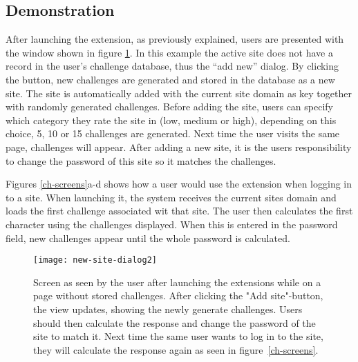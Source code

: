 

\subsection{Demonstration}\label{demo}
After launching the extension, as previously explained, users are presented with the window shown in figure \ref{launch-screen}. In this example the active site does not have a record in the user's challenge database, thus the ``add new'' dialog. By clicking the button, new challenges are generated and stored in the database as a new site. The site is automatically added with the current site domain as key together with randomly generated challenges. Before adding the site, users can specify which category they rate the site in (low, medium or high), depending on this choice, 5, 10 or 15 challenges are generated. Next time the user visits the same page, challenges will appear. After adding a new site, it is the users responsibility to change the password of this site so it matches the challenges.

\par Figures \ref{ch-screens}a-d shows how a user would use the extension when logging in to a site. When launching it, the system receives the current sites domain and loads the first challenge associated wit that site. The user then calculates the first character using the challenges displayed. When this is entered in the password field, new challenges appear until the whole password is calculated. 

\begin{figure}
    \centering
    \texttt{[image: new-site-dialog2]} 
    \caption{Screen as seen by the user after launching the extensions while on a page without stored challenges. After clicking the "Add site"-button, the view updates, showing the newly generate challenges. Users should then calculate the response and change the password of the site to match it. Next time the same user wants to log in to the site, they will calculate the response again as seen in figure~\ref{ch-screens}.}
    \label{launch-screen}
\end{figure}

